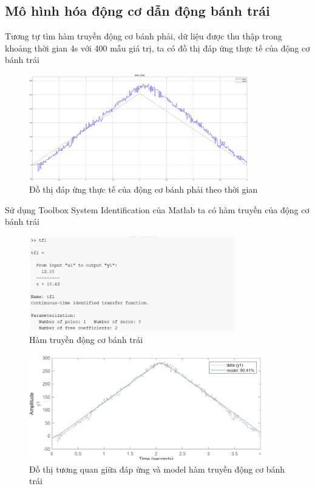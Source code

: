           \subsection{Mô hình hóa động cơ dẫn động bánh trái}
               \hspace*{0.6cm}Tương tự tìm hàm truyền động cơ bánh phải, dữ liệu được thu thập trong khoảng thời gian 4s với 400 mẫu giá trị, ta có đồ thị đáp ứng thực tế của động cơ bánh trái
               \begin{figure}[H]
                    \centering
                    \includegraphics[width=0.85\textwidth]{pictures/chapter5/CJGB2_response.png}
                    \caption{Đồ thị đáp ứng thực tế của động cơ bánh phải theo thời gian}
                    \label{CJGB2_response}
               \end{figure}  
               Sử dụng Toolbox System Identification của Matlab ta có hàm truyền của động cơ bánh trái 
               \begin{figure}[H]
                    \centering
                    \includegraphics[width=0.8\textwidth]{pictures/chapter5/CJGB2_tf.png}
                    \caption{Hàm truyền động cơ bánh trái}
                    \label{CJGB2_tf}
               \end{figure} 
               \begin{figure}[H]
                    \centering
                    \includegraphics[width=0.9\textwidth]{pictures/chapter5/CJGB2_compare.png}
                    \caption{Đồ thị tương quan giữa đáp ứng và model hàm truyền động cơ bánh trái}
                    \label{CJGB2_compare}
               \end{figure}
